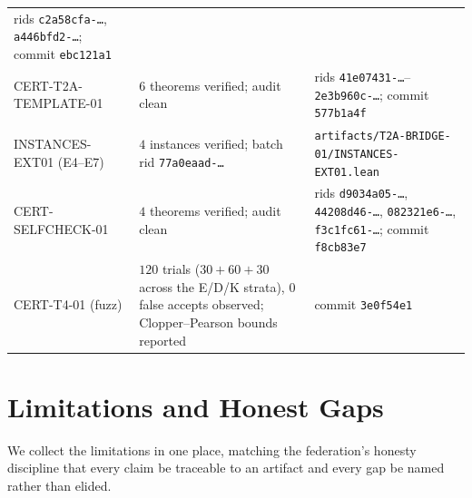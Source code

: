\documentclass[11pt]{article}
\theoremstyle{definition}
\theoremstyle{remark}
\newcommand{\rid}[1]{\texttt{#1}}
\newcommand{\lean}[1]{\texttt{#1}}
\begin{document}
\begin{table}[t]
\begin{tabular}{>{\raggedright\arraybackslash}p{4.6cm} >{\raggedright\arraybackslash}p{4.4cm} >{\raggedright\arraybackslash}p{5.2cm}}
rids \rid{c2a58cfa-\ldots}, \rid{a446bfd2-\ldots}; commit \rid{ebc121a1} \\
CERT-T2A-TEMPLATE-01 & $6$ theorems verified; audit clean &
rids \rid{41e07431-\ldots}--\rid{2e3b960c-\ldots}; commit \rid{577b1a4f} \\
INSTANCES-EXT01 (E4--E7) & $4$ instances verified; batch rid
\rid{77a0eaad-\ldots} & \lean{artifacts/T2A-BRIDGE-01/INSTANCES-EXT01.lean} \\
CERT-SELFCHECK-01 & $4$ theorems verified; audit clean &
rids \rid{d9034a05-\ldots}, \rid{44208d46-\ldots}, \rid{082321e6-\ldots},
\rid{f3c1fc61-\ldots}; commit \rid{f8cb83e7} \\
CERT-T4-01 (fuzz) & $120$ trials ($30+60+30$ across the E/D/K strata),
$0$ false accepts observed; Clopper--Pearson bounds reported & commit
\rid{3e0f54e1} \\
\bottomrule
\end{tabular}
\end{table}

\section{Limitations and Honest Gaps}\label{sec:limitations}

We collect the limitations in one place, matching the federation's honesty
discipline that every claim be traceable to an artifact and every gap be
named rather than elided.
\end{document}
